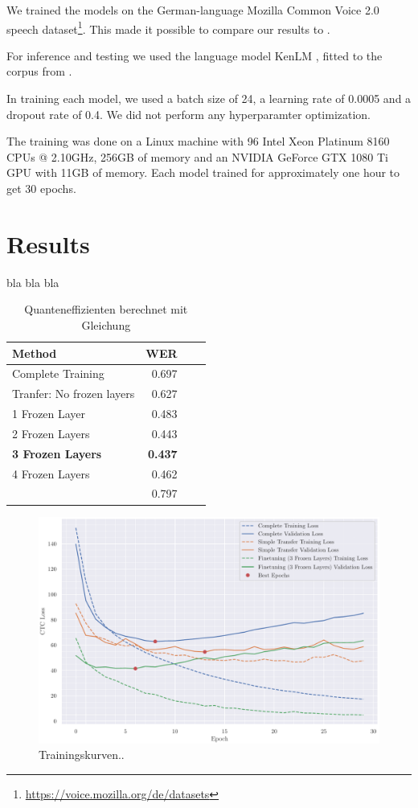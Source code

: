 \documentclass[12pt]{article}    %
\begin{document}
We trained the models on the German-language Mozilla Common Voice 2.0 speech dataset\footnote{\url{https://voice.mozilla.org/de/datasets}}. This made it possible to compare our results to \parencite{agarwal-zesch-2019-german}.

For inference and testing we used the language model KenLM \parencite{heafield-2011-kenlm}, fitted to the corpus from \parencite{Radeck-Arneth2015}.

In training each model, we used a batch size of 24, a learning rate of 0.0005 and a dropout rate of 0.4. We did not perform any hyperparamter optimization.

The training was done on a Linux machine with 96 Intel Xeon Platinum 8160 CPUs @ 2.10GHz, 256GB of memory and an NVIDIA GeForce GTX 1080 Ti GPU with 11GB of memory. Each model trained for approximately one hour to get 30 epochs.

\section{Results}
bla bla bla
\begin{table}[ht]
    \centering
    \vspace{5mm}
    \begin{tabular}{lrrr}
        \toprule
        Method & WER \\
        \midrule
        Complete Training & 0.697 \\
        Tranfer: No frozen layers & 0.627 \\
        1 Frozen Layer & 0.483 \\
        2 Frozen Layers & 0.443 \\
        \textbf{3 Frozen Layers} & \textbf{0.437} \\
        4 Frozen Layers & 0.462 \\
        \cite{agarwal-zesch-2019-german} & 0.797 \\
        \bottomrule
    \end{tabular}
    \caption{Quanteneffizienten berechnet mit Gleichung}
    \label{tab:results}
\end{table}

\begin{figure}[ht]
    \centering
    \includegraphics[width=\textwidth]{../3curves.pdf}
    \caption{Trainingskurven..}
    \label{fig:3c}
\end{figure}
\end{document}
